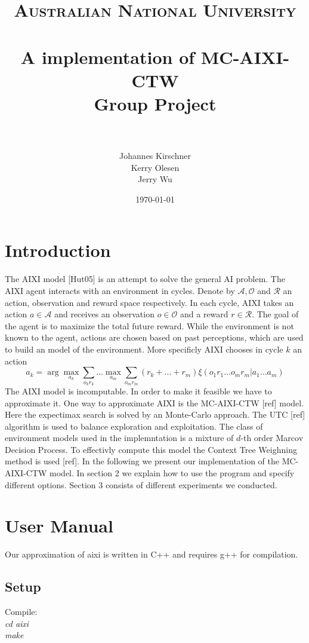 \documentclass[paper=a4, fontsize=11pt]{scrartcl} %
\title{	
\normalfont \normalsize 
\textsc{Australian National University} \\ [25pt] %
\horrule{0.5pt} \\[0.4cm] %
\huge A implementation of MC-AIXI-CTW\\ Group Project \\ %
\horrule{2pt} \\[0.5cm] %
}
\author{Johannes Kirschner\\ Kerry Olesen\\ Jerry Wu} %
\date{\normalsize\today} %
\numberwithin{equation}{section} %
\numberwithin{figure}{section} %
\numberwithin{table}{section} %
\begin{document}
\maketitle %

\section{Introduction}
The AIXI model [Hut05] is an attempt to solve the general AI problem. The AIXI agent interacts with an environment in cycles. Denote by $\mathcal{A}, \mathcal{O}$ and $\mathcal{R}$ an action, observation and reward space respectively. In each cycle, AIXI takes an action $a \in \mathcal{A}$ and receives an observation $o \in \mathcal{O}$ and a reward $r \in \mathcal{R}$. The goal of the agent is to maximize the total future reward. While the environment is not known to the agent, actions are chosen based on past perceptions, which are used to build an model of the environment. More specificly AIXI chooses in cycle $k$ an action
\[ a_k = \arg \max_{a_k} \sum_{o_kr_k} \dots \max_{a_m} \sum_{o_m r_m} (r_k + \dots + r_m)\xi(o_1r_1\dots o_m r_m|a_1\dots a_m) \]
The AIXI model is incomputable. In order to make it feasible we have to approximate it. One way to approximate AIXI is the MC-AIXI-CTW [ref] model. Here the expectimax search is solved by an Monte-Carlo approach. The UTC [ref] algorithm is used to balance exploration and exploitation. The class of environment models used in the implemntation is a mixture of $d$-th order Marcov Decision Process. To effectivly compute this model the Context Tree Weighning method is used [ref].
In the following we present our implementation of the MC-AIXI-CTW model. In section 2 we explain how to use the program and specify different options. Section 3 consists of different experiments we conducted.


\section{User Manual}

Our approximation of aixi is written in C++ and requires g++ for compilation.

\subsection{Setup}


\noindent Compile:\\
\indent \textit{cd aixi}\\
\indent \textit{make}
\end{document}

